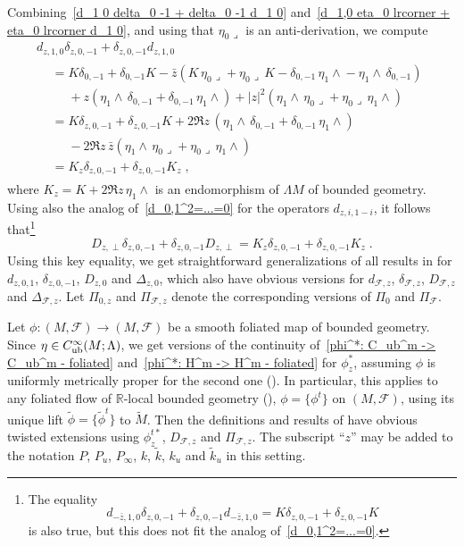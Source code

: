 \documentclass{memo-l}
\theoremstyle{plain}
\theoremstyle{definition}
\theoremstyle{remark}
\newcommand{\R}{\mathbb{R}}
\newcommand{\FF}{\mathcal{F}}
\newcommand{\Cinftyub}{C^\infty_{\text{\rm ub}}}
\numberwithin{section}{chapter}
\numberwithin{equation}{section}%
\begin{document}
Combining~\eqref{d_1 0 delta_0 -1 + delta_0 -1 d_1 0} and~\eqref{d_1,0 eta_0 lrcorner + eta_0 lrcorner d_1 0}, and using that ${\eta_0\lrcorner}$ is an anti-derivation, we compute
\begin{multline*}
d_{z,1,0}\delta_{z,0,-1}+\delta_{z,0,-1}d_{z,1,0}\\
\begin{aligned}
&=K\delta_{0,-1}+\delta_{0,-1}K-\bar z(K\,{\eta_0\lrcorner}+{\eta_0\lrcorner}\,K
-\delta_{0,-1}\,{\eta_1\wedge}-{\eta_1\wedge}\,\delta_{0,-1})\\
&\phantom{={}}{}+z({\eta_1\wedge}\,\delta_{0,-1}+\delta_{0,-1}\,{\eta_1\wedge})
+|z|^2({\eta_1\wedge}\,{\eta_0\lrcorner}+{\eta_0\lrcorner}\,{\eta_1\wedge})\\
&=K\delta_{z,0,-1}+\delta_{z,0,-1}K+2\Re z\,({\eta_1\wedge}\,\delta_{0,-1}+\delta_{0,-1}\,{\eta_1\wedge})\\
&\phantom{={}}{}-2\Re z\,\bar z({\eta_1\wedge}\,{\eta_0\lrcorner}+{\eta_0\lrcorner}\,{\eta_1\wedge})\\
&=K_z\delta_{z,0,-1}+\delta_{z,0,-1}K_z\;,
\end{aligned}
\end{multline*}
where $K_z=K+2\Re z\,{\eta_1\wedge}$ is an endomorphism of $\Lambda M$ of bounded geometry. Using also the analog of~\eqref{d_0,1^2=...=0} for the operators $d_{z,i,1-i}$, it follows that\footnote{The equality
\[
d_{-\bar z,1,0}\delta_{z,0,-1}+\delta_{z,0,-1}d_{-\bar z,1,0}=K\delta_{z,0,-1}+\delta_{z,0,-1}K
\]
is also true, but this does not fit the analog of~\eqref{d_0,1^2=...=0}.}
\begin{equation}\label{D_z perp delta_z 0 -1 + delta_z 0 -1 D_z perp}
D_{z,\perp}\delta_{z,0,-1}+\delta_{z,0,-1}D_{z,\perp}=K_z\delta_{z,0,-1}+\delta_{z,0,-1}K_z\;.
\end{equation}
Using this key equality, we get straightforward generalizations of all results in  for $d_{z,0,1}$, $\delta_{z,0,-1}$, $D_{z,0}$ and $\Delta_{z,0}$, which also have obvious versions for $d_{\FF,z}$, $\delta_{\FF,z}$, $D_{\FF,z}$ and $\Delta_{\FF,z}$. Let $\Pi_{0,z}$ and $\Pi_{\FF,z}$ denote the corresponding versions of $\Pi_0$ and $\Pi_\FF$.

Let $\phi:(M,\FF)\to(M,\FF)$ be a smooth foliated map of bounded geometry. Since $\eta\in \Cinftyub(M;\Lambda)$, we get versions of the continuity of~\eqref{phi^*: C_ub^m -> C_ub^m - foliated} and~\eqref{phi^*: H^m -> H^m - foliated} for $\phi^*_z$, assuming $\phi$ is uniformly metrically proper for the second one (). In particular, this applies to any foliated flow of $\R$-local bounded geometry (), $\phi=\{\phi^t\}$ on $(M,\FF)$, using its unique lift $\tilde\phi=\{\tilde\phi^t\}$ to $\widetilde M$. Then the definitions and results of  have obvious twisted extensions using $\phi^{t*}_z$, $D_{\FF,z}$ and $\Pi_{\FF,z}$. The subscript ``$z$'' may be added to the notation $P$, $P_u$, $P_\infty$, $k$, $\tilde k$, $k_u$ and $\tilde k_u$ in this setting.
\end{document}
